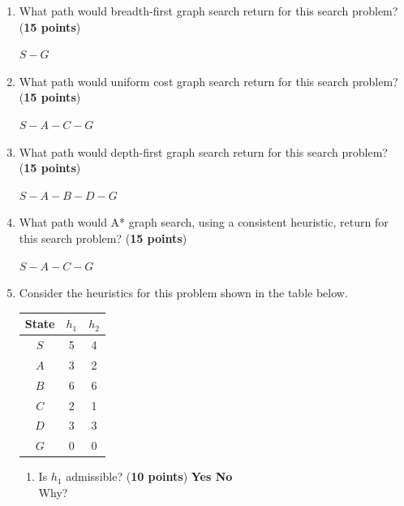 \begin{enumerate}
  \item What path would breadth-first graph search return for this search problem? (\textbf{15 points})

  {\color{red} $S-G$}

\vspace{1cm}

  \item What path would uniform cost graph search return for this search problem? (\textbf{15 points})

  {\color{red} $S-A-C-G$}

\vspace{1cm}

  \item What path would depth-first graph search return for this search problem? (\textbf{15 points})

  {\color{red} $S-A-B-D-G$}

\vspace{1cm}

  \item What path would A* graph search, using a consistent heuristic, return for this search problem? (\textbf{15 points})

  {\color{red} $S-A-C-G$}

  \newpage

  \item Consider the heuristics for this problem shown in the table below.
  \begin{center}
  \begin{tabular}{|c|c|c|}
    \hline
    State & $h_1$ & $h_2$\\
    \hline
    $S$ & 5 & 4 \\
    \hline
    $A$ & 3 & 2 \\
    \hline
    $B$ & 6 & 6 \\
    \hline
    $C$ & 2 & 1 \\
    \hline
    $D$ & 3 & 3 \\
    \hline
    $G$ & 0 & 0 \\
    \hline
  \end{tabular}
  \end{center}
  \begin{enumerate}
      \item Is $h_1$ admissible? (\textbf{10 points}) \textbf{Yes \hspace{5pt} {\color{red} No}}\\
      Why?
      \vspace{2cm}


\end{enumerate}
\end{enumerate}
